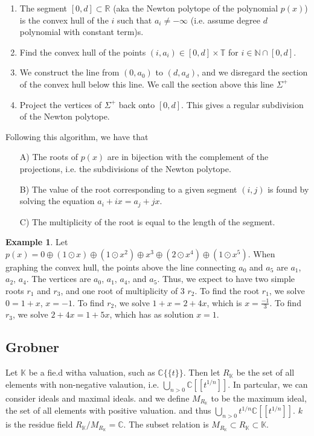 \documentclass[11pt]{article}
\theoremstyle{definition}
\newtheorem{protoexample}{Example}[section]
\newenvironment{ex}
   {\begin{protoexample}}
   {\end{protoexample}}
\def\RR{{\mathbb R}}
\def\KK{{\mathbb K}}
\def\CC{{\mathbb C}}
\def\NN{{\mathbb N}}
\def\TT{{\mathbb T}}
\begin{document}
\begin{enumerate}
    \item The segment $[0,d]\subset \RR$ (aka the Newton polytope of the polynomial $p(x)$) is the convex hull of the $i$ such that $a_i \neq - \infty$ (i.e. assume degree $d$ polynomial with constant term)s.
    \item Find the convex hull of the points $(i,a_i)\in [0,d] \times \TT$ for $i \in \NN \cap [0,d]$.
    \item We construct the line from $(0,a_0)$ to $(d,a_d)$, and we disregard the section of the convex hull below this line. We call the section above this line $\Sigma^+$
    \item Project the vertices of $\Sigma^+$ back onto $[0,d]$. This gives a regular subdivision of the Newton polytope.
\end{enumerate}
Following this algorithm, we have that
\begin{itemize}
    \item [A)] The roots of $p(x)$ are in bijection with the complement of the projections, i.e. the subdivisions of the Newton polytope.
    \item [B)] The value of the root corresponding to a given segment $(i,j)$ is found by solving the equation $a_i + ix = a_j  +jx$.
    \item [C)] The multiplicity of the root is equal to the length of the segment.
\end{itemize}



\begin{ex}
    Let $p(x) = 0 \oplus (1 \odot x) \oplus (1\odot x^2) \oplus x^3 \oplus (2\odot x^4) \oplus (1 \odot x^5)$. When graphing the convex hull, the points above the line connecting $a_0$ and $a_5$ are $a_1$, $a_2$, $a_4$. The vertices are $a_0$, $a_1$, $a_4$, and $a_5$. Thus, we expect to have two simple roots $r_1$ and $r_3$, and one root of multiplicity of $3$ $r_2$. To find the root $r_1$, we solve $0=1+x$, $x=-1$. To find $r_2$, we solve $1+x = 2 + 4x$, which is $x=\frac{-1}{3}$. To find $r_3$, we solve $2 + 4x=1+5x$, which has as solution $x=1$.
\end{ex}





\subsection{Grobner}
Let $\KK$ be a fie.d witha  valuation, such as $\CC\{\{t\}\}$. Then let $R_\KK$ be the set of all elements with non-negative valaution, i.e. $\bigcup \limits_{n >0}\CC[[t^{1/n}]]$. In partcular, we can consider ideals and maximal ideals. and we define $M_{R_\KK}$ to be the maximum ideal, the set of all elements with positive valuation. and thus $\bigcup\limits_{n>0} t^{1/n}\CC[[t^{1/n}]]$. $k$ is the residue field $R_\KK/ M_{R_\KK} = \CC$. The subset relation is $M_{R_\KK} \subset R_\KK \subset \KK$.
\end{document}
